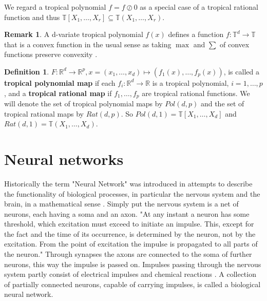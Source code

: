 \documentclass{article}
\theoremstyle{definition}
\newtheorem{definition}[theorem]{Definition}
\newtheorem{remark}[theorem]{Remark}
\begin{document}
We regard a tropical polynomial $f=f \oslash 0$ as a special case of a tropical rational function and thus $\mathbb{T}[X_1, \dots , X_r] \subseteq \mathbb{T}(X_1, \dots , X_r)$. \cite[p.~3]{zhang2018tropical}

\begin{remark}
A d-variate tropical polynomial $f(x)$ defines a function $f: \mathbb{T}^{d} \to \mathbb{T}$ that is a convex function in the usual sense as taking $\max$ and $\sum$ of convex functions preserve convexity \cite{boyd2004convex}.
\end{remark}

\begin{definition}\hspace{1sp}\cite[p.~3]{zhang2018tropical}\label{def:trop_map}
$F : \mathbb{R}^{d} \to \mathbb{R}^{p}, x = (x_1, \dots , x_d)\mapsto (f_1(x), \dots , f_p(x))$, is called a \textbf{tropical polynomial map} if each $f_i : \mathbb{R}^{d} \to \mathbb{R}$ is a tropical polynomial, $i = 1, \dots , p$, and a \textbf{tropical rational map} if $f_1, \dots , f_p$ are tropical rational functions. We will denote the set of tropical polynomial maps by $Pol(d, p)$ and the set of tropical rational maps by $Rat(d, p)$. So $Pol(d, 1) = \mathbb{T}[X_1, \dots , X_d]$ and $Rat(d, 1) = \mathbb{T}(X_1, \dots , X_d)$.
\end{definition}

\newpage

\section{Neural networks}
\label{sec:neural_networks}
Historically the term "Neural Network" was introduced in attempts to describe the functionality of biological processes, in particular the nervous system and the brain, in a mathematical sense \cite{mcculloch1943logical, widrow1960adaptive, rumelhart1986learning}. Simply put the nervous system is a net of neurons, each having a soma and an axon. "At any instant a neuron has some threshold, which excitation must exceed to initiate an impulse. This, except for the fact and the time of its occurrence, is determined by the neuron, not by the excitation. From the point of excitation the impulse is propagated to all parts of the neuron." \cite[p.~1]{mcculloch1943logical} Through synapses the axons are connected to the soma of further neurons, this way the impulse is passed on. Impulses passing through the nervous system partly consist of electrical impulses and chemical reactions \cite{palay1956synapses}. A collection of partially connected neurons, capable of carrying impulses, is called a biological neural network.
\end{document}
